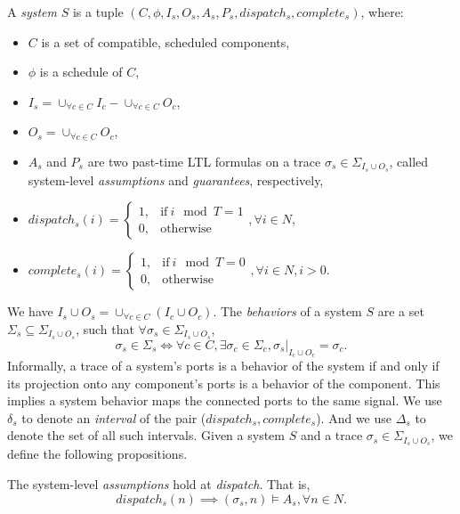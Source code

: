 A \emph{system} $S$ is a tuple $(C, \phi, I_s, O_s, A_s, P_s, dispatch_s, complete_s)$, where:
\begin{itemize}
	\item $C$ is a set of compatible, scheduled components,
	\item $\phi$ is a schedule of $C$,	
	\item $I_s = \cup_{\forall c \in C}I_c -  \cup_{\forall c \in C}O_c$,
	\item $O_s = \cup_{\forall c \in C}O_c$,
	\item $A_s$ and $P_s$ are two past-time LTL formulas on a trace $\sigma_s \in \Sigma_{I_s \cup O_s}$, called system-level \emph{assumptions} and \emph{guarantees}, respectively,
	\item $dispatch_s (i) = 
	    	\begin{cases}
      		1, & \text{if}\ i \mod T =1 \\
	     	0, & \text{otherwise}
   	 	\end{cases}, \forall i \in N$,
   	\item $complete_s (i) =
   		\begin{cases}
      		1, & \text{if}\ i \mod T = 0 \\
	     	0, & \text{otherwise}
   	 	\end{cases}, \forall i \in N, i > 0$.
\end{itemize}
We have $I_s  \cup O_s = \cup_{\forall c \in C}(I_c \cup O_c)$.
The \emph{behaviors} of a system $S$ are a set $\Sigma_s \subseteq \Sigma_{I_s \cup O_s}$, such that $\forall \sigma_s \in \Sigma_{I_s \cup O_s}$, 
\begin{equation*}
	\sigma_s\in \Sigma_s  \iff \forall c \in C, \exists \sigma_c \in \Sigma_c, \sigma_s|_{I_c \cup O_c} = \sigma_c.
\end{equation*}
Informally, a trace of a system's ports is a behavior of the system if and only if its projection onto any component's ports is a behavior of the component. 
This implies a system behavior maps the connected ports to the same signal.
We use $\delta_s$ to denote an \emph{interval} of the pair ($dispatch_s, complete_s$). And we use $\Delta_s$ to denote the set of all such intervals.
Given a system $S$ and a trace $\sigma_s \in \Sigma_{I_s \cup O_s}$, we define the following propositions.

The system-level \emph{assumptions} hold at \emph{dispatch}. That is,
\begin{equation} 
\label{eqn:sys_assumption}
	dispatch_s(n) \implies (\sigma_s, n) \models A_s, \forall n\in N.
\end{equation}

